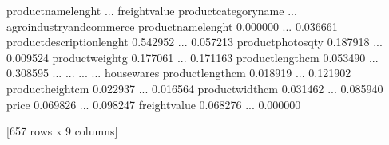 \documentclass[letterpaper,10pt,english]{jupyterBook}
\begin{document}
\begin{sphinxVerbatim}[commandchars=\\\{\}]
  
      \PYG{p}{[}  \PYG{p}{]}  
\end{sphinxVerbatim}

\begin{sphinxVerbatim}[commandchars=\\\{\}]
                                                       product\PYGZus{}name\PYGZus{}lenght  ...  freight\PYGZus{}value
product\PYGZus{}category\PYGZus{}name                                                       ...               
agro\PYGZus{}industry\PYGZus{}and\PYGZus{}commerce product\PYGZus{}name\PYGZus{}lenght                    0.000000  ...       0.036661
                           product\PYGZus{}description\PYGZus{}lenght             0.542952  ...       0.057213
                           product\PYGZus{}photos\PYGZus{}qty                     0.187918  ...      \PYGZhy{}0.009524
                           product\PYGZus{}weight\PYGZus{}g                       0.177061  ...       0.171163
                           product\PYGZus{}length\PYGZus{}cm                     \PYGZhy{}0.053490  ...       0.308595
...                                                                    ...  ...            ...
housewares                 product\PYGZus{}length\PYGZus{}cm                      0.018919  ...       0.121902
                           product\PYGZus{}height\PYGZus{}cm                      0.022937  ...      \PYGZhy{}0.016564
                           product\PYGZus{}width\PYGZus{}cm                       0.031462  ...       0.085940
                           price                                  0.069826  ...       0.098247
                           freight\PYGZus{}value                          0.068276  ...       0.000000

[657 rows x 9 columns]
\end{sphinxVerbatim}
\end{document}
